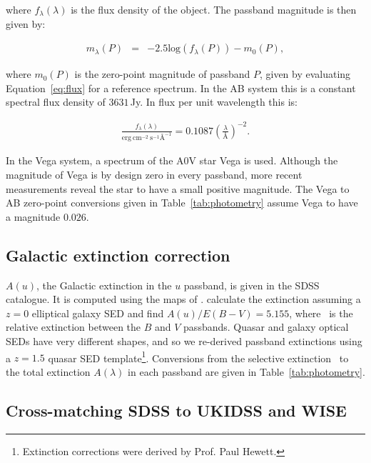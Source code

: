 \noindent where $f_\lambda(\lambda)$ is the flux density of the object. 
The passband magnitude is then given by:   

\begingroup\makeatletter{}\check@mathfonts
\begin{eqnarray}
\label{eq:mag}
  m_\lambda(P) & = & -2.5\text{log}(f_\lambda(P)) - m_0(P), 
\end{eqnarray}
\endgroup

\noindent where $m_0(P)$ is the zero-point magnitude of passband $P$, given by evaluating Equation~\ref{eq:flux} for a reference spectrum. 
In the AB system this is a constant spectral flux density of $3631$\,Jy. 
In flux per unit wavelength this is:  

\begingroup\makeatletter{}\check@mathfonts
\begin{eqnarray}
  \frac{f_\lambda(\lambda)}{\text{erg}~\text{cm}^{-2}~\text{s}^{-1} \text{\AA}^{-1}} = 0.1087 \left(\frac{\lambda}{\text{\AA}}\right)^{-2}.
\end{eqnarray}
\endgroup

\noindent In the Vega system, a spectrum of the A$0$V star Vega is used. 
Although the magnitude of Vega is by design zero in every passband, more recent measurements reveal the star to have a small positive magnitude. 
The Vega to AB zero-point conversions given in Table~\ref{tab:photometry} assume Vega to have a magnitude $0.026$. 

\subsection{Galactic extinction correction}

$A(u)$, the Galactic extinction in the $u$ passband, is given in the SDSS catalogue. 
It is computed using the maps of \citet{schlegel98}.
\citet{schlegel98} calculate the extinction assuming a $z=0$ elliptical galaxy SED and find $A(u)/E(B-V)=5.155$, where \ebv\, is the relative extinction between the $B$ and $V$ passbands. 
Quasar and galaxy optical SEDs have very different shapes, and so we re-derived passband extinctions using a $z=1.5$ quasar SED template\footnote{Extinction corrections were derived by Prof. Paul Hewett.}.
Conversions from the selective extinction \ebv\, to the total extinction $A(\lambda)$ in each passband are given in Table~\ref{tab:photometry}.  
 
\subsection{Cross-matching SDSS to UKIDSS and WISE}

